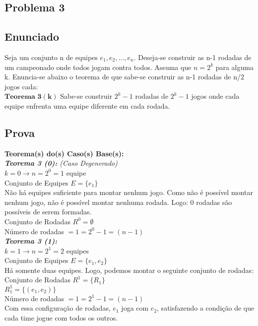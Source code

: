 \documentclass[twoside]{article}
\begin{document}
\begin{multicols}{2}
\newpage
\section{Problema 3}

\subsection{ Enunciado }
\indent Seja um conjunto n de equipes $e_1,e_2,\dots,e_n$. Deseja-se construir as n-1 rodadas de um campeonado onde todos jogam contra todos. Assuma que $n=2^k$ para alguma k. Enuncia-se abaixo o teorema de que sabe-se construir as n-1 rodadas de n/2 jogos cada:\\

$\mathbf{Teorema}$ $\mathbf{3}$$\mathbf{(k)}$ Sabe-se construir $2^k - 1$ rodadas de $2^k - 1$ jogos onde cada equipe enfrenta uma equipe diferente em cada rodada.\\

\subsection{ Prova }
\indent 

\textbf{Teorema(s) do(s) Caso(s) Base(s):}\\

\textit{\textbf{Teorema 3 (0):} (Caso Degenerado)}\\
$ k=0 \rightarrow n=2^0=1$ equipe\\
Conjunto de Equipes $E = \{e_1\}$\\
Não há equipes suficiente para montar nenhum jogo. Como não é possível montar nenhum jogo, não é possível montar nenhuma rodada. Logo: 0 rodadas são possíveis de serem formadas.\\
Conjunto de Rodadas $R^0 = \emptyset$\\
Número de rodadas $= 1 = 2^0-1 = (n-1)$\\

\textit{\textbf{Teorema 3 (1):}}\\
$ k=1 \rightarrow n=2^1=2$ equipes\\
Conjunto de Equipes $E = \{e_1,e_2\}$\\
Há somente duas equipes. Logo, podemos montar o seguinte conjunto de rodadas:\\
Conjunto de Rodadas $R^1 = \{R_1\}$\\
 $R^1_1 =\{(e_1,e_2)\}$\\
Número de rodadas $= 1 = 2^1-1 = (n-1)$\\
Com essa configuração de rodadas, $e_1$ joga com $e_2$, satisfazendo a condição de que cada time jogue com todos os outros.\\


\end{multicols}
\end{document}
